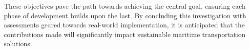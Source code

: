 These objectives pave the path towards achieving the central goal, ensuring each phase of development builds upon the last. By concluding this investigation with assessments geared towards real-world implementation, it is anticipated that the contributions made will significantly impact sustainable maritime transportation solutions.



